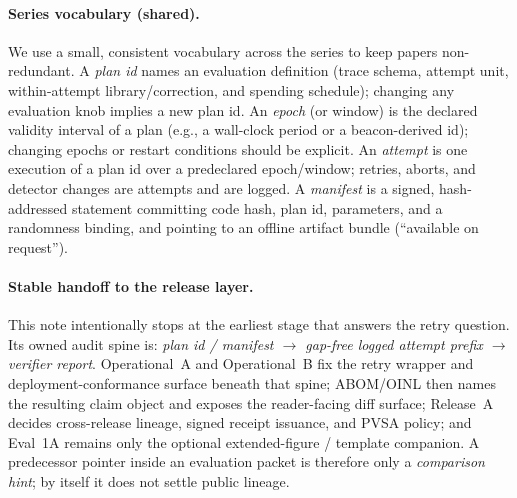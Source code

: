 \documentclass[11pt]{article}
\begin{document}
\paragraph{Series vocabulary (shared).}
We use a small, consistent vocabulary across the series to keep papers non-redundant.
A \emph{plan id} names an evaluation definition (trace schema, attempt unit, within-attempt library/correction, and spending schedule);
changing any evaluation knob implies a new plan id.
An \emph{epoch} (or window) is the declared validity interval of a plan (e.g., a wall-clock period or a beacon-derived id); changing epochs or restart conditions should be explicit.
An \emph{attempt} is one execution of a plan id over a predeclared epoch/window; retries, aborts, and detector changes are attempts and are logged.
A \emph{manifest} is a signed, hash-addressed statement committing code hash, plan id, parameters, and a randomness binding, and pointing to an offline artifact bundle (``available on request'').

\paragraph{Stable handoff to the release layer.}
This note intentionally stops at the earliest stage that answers the retry question.
Its owned audit spine is: \emph{plan id / manifest $\rightarrow$ gap-free logged attempt prefix $\rightarrow$ verifier report}.
Operational~A and Operational~B fix the retry wrapper and deployment-conformance surface beneath that spine; ABOM/OINL then names the resulting claim object and exposes the reader-facing diff surface; Release~A decides cross-release lineage, signed receipt issuance, and PVSA policy; and Eval~1A remains only the optional extended-figure / template companion.\cite{series:abomoinl,series:releaseproperty,series:evalnotaryaddendum}
A predecessor pointer inside an evaluation packet is therefore only a \emph{comparison hint}; by itself it does not settle public lineage.
\end{document}
